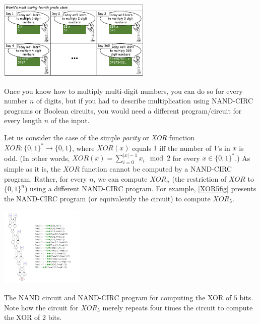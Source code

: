 \begin{marginfigure}
\centering
\includegraphics[width=\linewidth, height=1.5in, keepaspectratio]{../figure/multiplicationschool.png}
\caption{Once you know how to multiply multi-digit numbers, you can do
so for every number \(n\) of digits, but if you had to describe
multiplication using NAND-CIRC programs or Boolean circuits, you would
need a different program/circuit for every length \(n\) of the input.}
\label{multschoolfig}
\end{marginfigure}

Let us consider the case of the simple \emph{parity} or \emph{XOR}
function \(\ensuremath{\mathit{XOR}}:\{0,1\}^* \rightarrow \{0,1\}\),
where \(\ensuremath{\mathit{XOR}}(x)\) equals \(1\) iff the number of
\(1\)'s in \(x\) is odd. (In other words,
\(\ensuremath{\mathit{XOR}}(x) = \sum_{i=0}^{|x|-1} x_i \mod 2\) for
every \(x\in \{0,1\}^*\).) As simple as it is, the
\(\ensuremath{\mathit{XOR}}\) function cannot be computed by a NAND-CIRC
program. Rather, for every \(n\), we can compute
\(\ensuremath{\mathit{XOR}}_n\) (the restriction of
\(\ensuremath{\mathit{XOR}}\) to \(\{0,1\}^n\)) using a different
NAND-CIRC program. For example, \cref{XOR5fig} presents the NAND-CIRC
program (or equivalently the circuit) to compute
\(\ensuremath{\mathit{XOR}}_5\).


\begin{marginfigure}
\centering
\includegraphics[width=\linewidth, height=1.5in, keepaspectratio]{../figure/xor5circprog.png}
\caption{The NAND circuit and NAND-CIRC program for computing the XOR of
\(5\) bits. Note how the circuit for \(\ensuremath{\mathit{XOR}}_5\)
merely repeats four times the circuit to compute the XOR of \(2\) bits.}
\label{XOR5fig}
\end{marginfigure}

